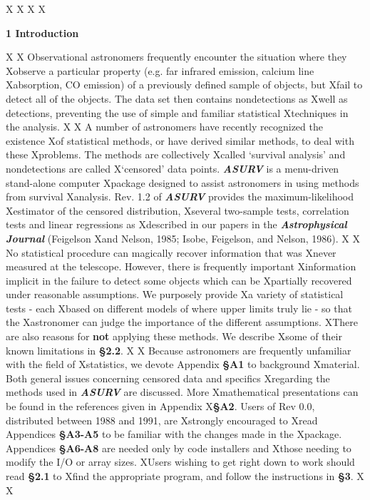 X
X\newpage
X
X\centerline{\Large\bf 1  Introduction} 
X
X    Observational astronomers frequently encounter the situation where they 
Xobserve a particular property (e.g. far infrared emission, calcium line 
Xabsorption, CO emission) of a previously defined sample of objects, but 
Xfail to detect all of the objects.  The data set then contains nondetections as 
Xwell as detections, preventing the use of simple and familiar statistical 
Xtechniques in the analysis.   
X 
X     A number of astronomers have recently recognized the existence 
Xof statistical methods, or have derived similar methods, to deal with these 
Xproblems.  The methods are collectively
Xcalled `survival analysis' and nondetections are called 
X`censored' data points.  {\sl\bf ASURV} is a menu-driven stand-alone computer
Xpackage designed  to assist astronomers in using methods from survival 
Xanalysis.  Rev. 1.2 of {\sl\bf ASURV}  provides the maximum-likelihood
Xestimator of the censored distribution,
Xseveral two-sample tests, correlation tests and linear regressions  as
Xdescribed in our papers in the {\it\bf Astrophysical Journal} (Feigelson 
Xand Nelson, 1985; Isobe, Feigelson, and Nelson, 1986). 
X
X     No statistical procedure can magically recover information that was
Xnever measured at the telescope.  However, there is frequently important 
Xinformation implicit in the failure to detect some objects which can be
Xpartially recovered under reasonable assumptions. We purposely provide 
Xa variety of statistical tests - each 
Xbased on different models of where  upper limits truly lie - so that the
Xastronomer can judge the importance of the different assumptions.  
XThere are also reasons for {\bf not} applying these methods.  We describe
Xsome of their known limitations in {\bf \S  2.2}.
X
X     Because astronomers are frequently unfamiliar with the field of 
Xstatistics, we devote Appendix {\bf  \S A1} to background 
Xmaterial.  Both general issues concerning censored data and specifics 
Xregarding the methods used in {\sl\bf ASURV} are discussed.  More 
Xmathematical presentations can be found in the references given in Appendix
X{\bf \S A2}. Users of Rev 0.0, distributed between 1988 and 1991,  are 
Xstrongly encouraged to 
Xread Appendices {\bf \S A3-A5} to be familiar with the changes made in the 
Xpackage.  Appendices {\bf \S A6-A8} are needed only by code installers and
Xthose needing to modify the I/O or array sizes.  
XUsers wishing to get right down to work should read  {\bf \S 2.1} to
Xfind the appropriate program, and follow  the instructions in {\bf \S 3}. 
X
X\bigskip
